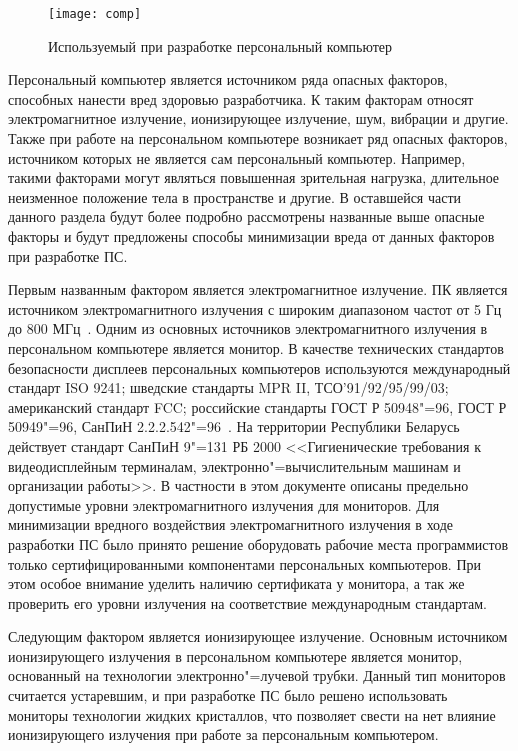 \begin{figure}[ht!]
  \begin{center}
    \texttt{[image: comp]}
    \caption{Используемый при разработке персональный компьютер}
    \label{ot_pc_pic}
  \end{center}
\end{figure}

Персональный компьютер является источником ряда опасных факторов, способных нанести вред здоровью разработчика.
К таким факторам относят электромагнитное излучение, ионизирующее излучение, шум, вибрации и другие.
Также при работе на персональном компьютере возникает ряд опасных факторов, источником которых не является сам персональный компьютер.
Например, такими факторами могут являться повышенная зрительная нагрузка, длительное неизменное положение тела в пространстве и другие.
В оставшейся части данного раздела будут более подробно рассмотрены названные выше опасные факторы
и будут предложены способы минимизации вреда от данных факторов при разработке ПС.

Первым названным фактором является электромагнитное излучение.
ПК является источником электромагнитного излучения с широким диапазоном частот от 5 Гц до 800 МГц~\cite{ot_emr_pc}.
Одним из основных источников электромагнитного излучения в персональном компьютере является монитор.
В качестве технических стандартов безопасности дисплеев персональных компьютеров используются
  международный стандарт ISO 9241;
  шведские стандарты MPR II, ТСО'91/92/95/99/03;
  американский стандарт FCC;
  российские стандарты ГОСТ Р 50948"=96, ГОСТ Р 50949"=96, СанПиН 2.2.2.542"=96~\cite{ot_emr_pc}.
На территории Республики Беларусь действует стандарт СанПиН 9"=131 РБ 2000 <<Гигиенические требования к видеодисплейным терминалам, электронно"=вычислительным машинам и организации работы>>.
В частности в этом документе описаны предельно допустимые уровни электромагнитного излучения для мониторов.
Для минимизации вредного воздействия электромагнитного излучения в ходе разработки ПС было принято решение оборудовать рабочие места программистов только сертифицированными компонентами персональных компьютеров. При этом особое внимание уделить наличию сертификата у монитора, а так же проверить его уровни излучения на соответствие международным стандартам.

Следующим фактором является ионизирующее излучение.
Основным источником ионизирующего излучения в персональном компьютере является монитор, основанный на технологии электронно"=лучевой трубки.
Данный тип мониторов считается устаревшим, и при разработке ПС было решено использовать мониторы технологии жидких кристаллов,
что позволяет свести на нет влияние ионизирующего излучения при работе за персональным компьютером.

